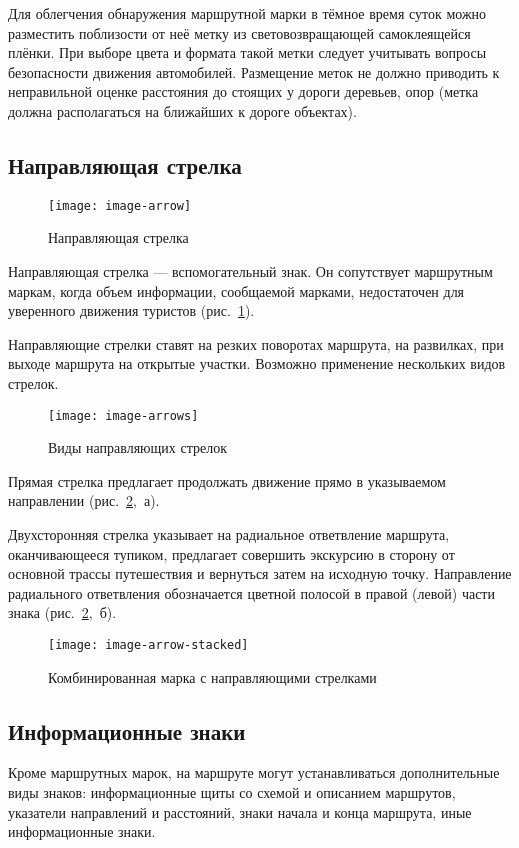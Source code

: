 \documentclass[a4paper,12pt]{extarticle}
\begin{document}
Для облегчения обнаружения маршрутной марки в тёмное время суток можно разместить поблизости от неё метку из световозвращающей самоклеящейся
плёнки. При выборе цвета и формата такой метки следует учитывать вопросы безопасности движения автомобилей. Размещение
меток не должно приводить к неправильной оценке расстояния до стоящих у дороги деревьев, опор
(метка должна располагаться на ближайших к дороге объектах).

\subsection{Направляющая стрелка}
\begin{figure}
	\centering
	\texttt{[image: image-arrow]}
	\caption{Направляющая стрелка}\label{fig:arrow}
\end{figure}

Направляющая стрелка --- вспомогательный знак. Он сопутствует маршрутным маркам, когда объем информации, сообщаемой
марками, недостаточен для уверенного движения туристов (рис.~\ref{fig:arrow}).

Направляющие стрелки ставят на резких поворотах маршрута, на развилках, при выходе маршрута на открытые участки.
Возможно применение нескольких видов стрелок.

\begin{figure}
	\centering
	\texttt{[image: image-arrows]}
	\caption{Виды направляющих стрелок}\label{fig:arrows}
\end{figure}

Прямая стрелка предлагает продолжать движение прямо в указываемом направлении (рис.~\ref{fig:arrows},~а).

Двухсторонняя стрелка указывает на радиальное ответвление маршрута, оканчивающееся тупиком, предлагает
совершить экскурсию в сторону от основной трассы путешествия и вернуться затем на исходную точку. Направление
радиального ответвления обозначается цветной полосой в правой (левой) части знака (рис.~\ref{fig:arrows},~б).

\begin{figure}[ht]
	\centering
	\texttt{[image: image-arrow-stacked]}
	\caption{Комбинированная марка с направляющими стрелками}\label{fig:arrow-stacked}
\end{figure}


\subsection{Информационные знаки}
Кроме маршрутных марок, на маршруте могут устанавливаться дополнительные виды знаков: информационные щиты со схемой и
описанием маршрутов, указатели направлений и расстояний, знаки начала и конца маршрута, иные информационные знаки.
\end{document}

